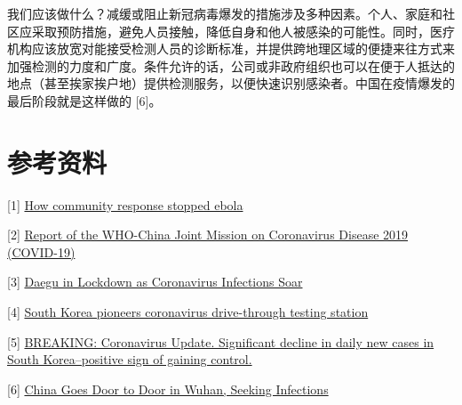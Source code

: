 \documentclass[onecolumn,journal]{IEEEtran}
\begin{document}
\begin{multicols}{2}
我们应该做什么？减缓或阻止新冠病毒爆发的措施涉及多种因素。个人、家庭和社区应采取预防措施，避免人员接触，降低自身和他人被感染的可能性。同时，医疗机构应该放宽对能接受检测人员的诊断标准，并提供跨地理区域的便捷来往方式来加强检测的力度和广度。条件允许的话，公司或非政府组织也可以在便于人抵达的地点（甚至挨家挨户地）提供检测服务，以便快速识别感染者。中国在疫情爆发的最后阶段就是这样做的 [6]。

\section*{参考资料}

[1] \href{https://necsi.edu/how-community-response-stopped-ebola}{How community response stopped ebola}

[2] \href{https://www.who.int/docs/default-source/coronaviruse/who-china-joint-mission-on-covid-19-final-report.pdf}{Report of the WHO-China Joint Mission on Coronavirus Disease 2019 (COVID-19)}

[3] \href{http://english.chosun.com/site/data/html_dir/2020/02/24/2020022401353.html}{Daegu in Lockdown as Coronavirus Infections Soar}

[4] \href{https://www.cnn.com/2020/03/02/asia/coronavirus-drive-through-south-korea-hnk-intl/index.html}{South Korea pioneers coronavirus drive-through testing station}

[5] \href{https://twitter.com/yaneerbaryam/status/1235734017699430401?s=20}{BREAKING: Coronavirus Update. Significant decline in daily new cases in South Korea--positive sign of gaining control.}

[6] \href{https://www.courthousenews.com/china-goes-door-to-door-in-wuhan-seeking-infections/}{China Goes Door to Door in Wuhan, Seeking Infections}




\end{multicols}



% 
\end{document}
